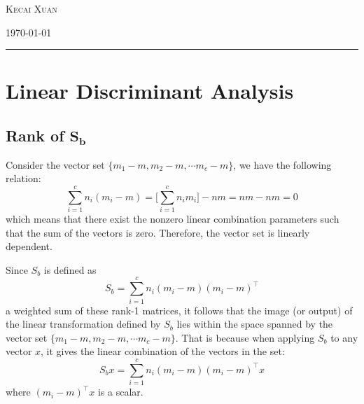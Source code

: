 \documentclass[12pt]{article}
\newcommand{\0}{\boldsymbol{0}}
\begin{document}
\begin{titlepage}
    \vspace{0.013\textheight}

    {\large \textsc{Kecai Xuan}}

    \vspace{0.013\textheight}

    \vspace{0.04\textheight}


    \vfill  %

    {\large \today}  %
    \vspace{0.04\textheight}  %


    \rule{\textwidth}{1pt}  %

\end{titlepage}

\section{Linear Discriminant Analysis}

\subsection{Rank of $\mathbf{S_b}$}

Consider the vector set $\{m_1 - m, m_2 - m,\cdots m_c-m\}$, we have the following relation:
\[
    \sum_{i=1}^c n_i\left(m_i-m\right)=\bigg[\sum_{i=1}^c n_i m_i\bigg]-n m=n m-n m=0
\]
which means that there exist the nonzero linear combination parameters such that the sum of the vectors is zero. Therefore, the vector set is linearly dependent.

Since $S_b$ is defined as
\[
    \displaystyle S_b=\sum_{i=1}^c n_i\left(m_i-m\right)\left(m_i-m\right)^\top
\]
a weighted sum of these rank-1 matrices, it follows that the image (or output) of the linear transformation defined by $S_b$ lies within the space spanned by the vector set $\{m_1 - m, m_2 - m,\cdots m_c-m\}$. That is because when applying $S_b$ to any vector $x$, it gives the linear combination of the vectors in the set:
\[
    S_b x = \sum_{i=1}^c n_i\left(m_i-m\right)\left(m_i-m\right)^\top x
\]
where $\left(m_i-m\right)^\top x$ is a scalar. 
\end{document}
